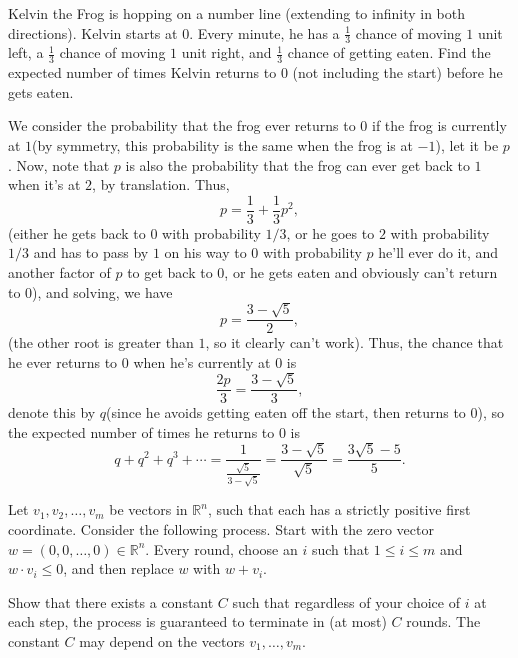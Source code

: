 \documentclass[11pt]{article}
\theoremstyle{definition}
\begin{document}
\begin{question}[name={2017 HMMT, November Guts, \href{https://artofproblemsolving.com/community/c129h1387221p7718382}{Problem 26}}]
	Kelvin the Frog is hopping on a number line (extending to infinity in both directions). Kelvin starts at $0$. Every minute, he has a $\frac{1}{3}$ chance of moving $1$ unit left, a $\frac{1}{3}$ chance of moving $1$ unit right, and $\frac{1}{3}$ chance of getting eaten. Find the expected number of times Kelvin returns to $0$ (not including the start) before he gets eaten.
\end{question}

\begin{solution}[name={Solution by Shaddoll}]
	We consider the probability that the frog ever returns to $0$ if the frog is currently at $1$(by symmetry, this probability is the same when the frog is at $-1$), let it be $p$. Now, note that $p$ is also the probability that the frog can ever get back to $1$ when it's at $2$, by translation. Thus, $$p=\frac{1}{3} + \frac{1}{3}p^2,$$(either he gets back to $0$ with probability ${1}/{3}$, or he goes to $2$ with probability ${1}/{3}$ and has to pass by $1$ on his way to $0$ with probability $p$ he'll ever do it, and another factor of $p$ to get back to $0$, or he gets eaten and obviously can't return to $0$), and solving, we have $$p = \frac{3-\sqrt{5}}{2},$$(the other root is greater than $1$, so it clearly can't work). Thus, the chance that he ever returns to $0$ when he's currently at $0$ is $$\frac{2p}{3} = \frac{3-\sqrt{5}}{3},$$ denote this by $q$(since he avoids getting eaten off the start, then returns to $0$), so the expected number of times he returns to $0$ is $$q+q^2+q^3+\cdots= \frac{1}{\frac{\sqrt{5}}{3-\sqrt{5}}} = \frac{3-\sqrt{5}}{\sqrt{5}} = \frac{3\sqrt{5}-5}{5}.$$
\end{solution}




\begin{question}[name={2017 HMIC, \href{https://artofproblemsolving.com/community/c6h1427494p8042809}{Problem 3}}]
	Let $v_1, v_2, \ldots, v_m$ be vectors in $\mathbb{R}^n$, such that each has a strictly positive first coordinate. Consider the following process. Start with the zero vector $w = (0, 0, \ldots, 0) \in \mathbb{R}^n$. Every round, choose an $i$ such that $1 \le i \le m$ and $w \cdot v_i \le 0$, and then replace $w$ with $w + v_i$.
	
	Show that there exists a constant $C$ such that regardless of your choice of $i$ at each step, the process is guaranteed to terminate in (at most) $C$ rounds. The constant $C$ may depend on the vectors $v_1, \ldots, v_m$.
\end{question}
\end{document}
